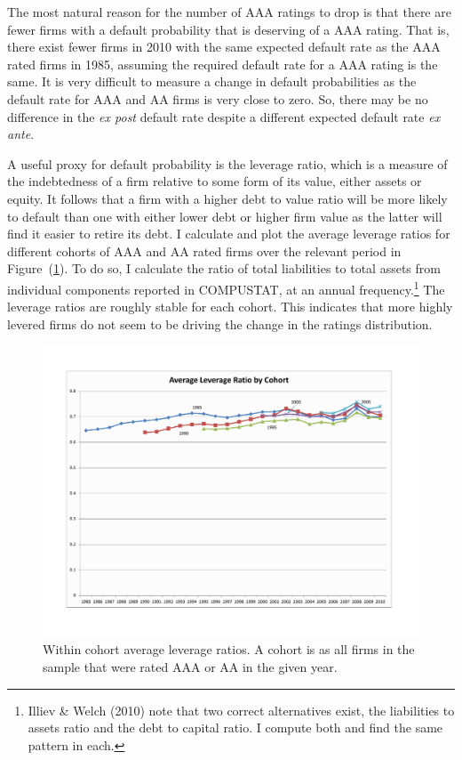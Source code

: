 \documentclass[titlepage]{article}
\begin{document}
The most natural reason for the number of AAA ratings to drop is that there are fewer firms with a default probability that is deserving of a AAA rating. That is, there exist fewer firms in 2010 with the same expected default rate as the AAA rated firms in 1985, assuming the required default rate for a AAA rating is the same. It is very difficult to measure a change in default probabilities as the default rate for AAA and AA firms is very close to zero. So, there may be no difference in the \emph{ex post} default rate despite a different expected default rate \textit{ex ante}. 

A useful proxy for default probability is the leverage ratio, which is a measure of the indebtedness of a firm relative to some form of its value, either assets or equity. It follows that a firm with a higher debt to value ratio will be more likely to default than one with either lower debt or higher firm value as the latter will find it easier to retire its debt. I calculate and plot the average leverage ratios for different cohorts of AAA and AA rated firms over the relevant period in Figure~(\ref{fig:coh_lev}). To do so, I calculate the ratio of total liabilities to total assets from individual components reported in COMPUSTAT, at an annual frequency.\footnote{Illiev \& Welch (2010) note that two correct alternatives exist, the liabilities to assets ratio and the debt to capital ratio. I compute both and find the same pattern in each.} The leverage ratios are roughly stable for each cohort. This indicates that more highly levered firms do not seem to be driving the change in the ratings distribution.

\begin{figure}[ht]
\centering
\includegraphics[width=\textwidth]{leverage_by_cohort_clr.pdf}
\caption{Within cohort average leverage ratios. A cohort is as all firms in the sample that were rated AAA or AA in the given year.}
\label{fig:coh_lev}
\end{figure}
\end{document}
